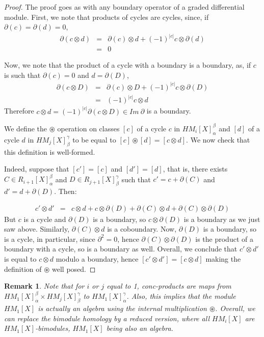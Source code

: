 \documentclass{article}
\newtheorem{remark}[definition]{Remark} %
\begin{document}
\begin{proof}
The proof goes as with any boundary operator of a graded differential module. First, we note that products of cycles are cycles, since, if $\partial(c)=\partial(d)=0$,  
$$
\begin{array}{rcl}
\partial(c\otimes d) & = & \partial(c)\otimes d +(-1)^{|c|} c\otimes \partial(d) \\
& = & 0
\end{array}
$$

Now, we note that the product of a cycle with a boundary is a boundary, as, if $c$ is such that $\partial(c)=0$ and $d=\partial(D)$, 
$$
\begin{array}{rcl}
\partial(c\otimes D) & = & \partial(c)\otimes D +(-1)^{|c|} c\otimes \partial(D) \\
& = & (-1)^{|c|} c \otimes d
\end{array}
$$
Therefore $c \otimes d=(-1)^{|c|} \partial(c\otimes D)\in Im \ \partial$ is a boundary. 

We define the $\circledast$ operation on classes $[c]$ of a cycle $c$ in $HM_i[X]^\beta_\alpha$ and $[d]$ of a cycle $d$ in $HM_j[X]^\gamma_\beta$ to be equal to $[c]\circledast [d]=[c\otimes d]$. We now check that this definition is well-formed. 

Indeed, suppose that $[c']=[c]$ and $[d']=[d]$, that is, there exists $C \in R_{i+1}[X]_\alpha^\beta$ and $D \in R_{j+1}[X]_\beta^\gamma$ such that $c'=c+\partial(C)$ and $d'=d+\partial(D)$. Then: 

$$
\begin{array}{rcl}
c'\otimes d' & = & c\otimes d+c\otimes \partial(D)+\partial(C)\otimes d + \partial(C)\otimes \partial(D)
\end{array}
$$
But $c$ is a cycle and $\partial(D)$ is a boundary, so $c\otimes \partial(D)$ is a boundary as we just saw above. Similarly, $\partial(C)\otimes d$ is a coboundary. Now, $\partial(D)$ is a boundary, so is a cycle, in particular, since $\partial^2=0$, hence $\partial(C)\otimes \partial(D)$ is the product of a boundary with a cycle, so is a boundary as well. Overall, we conclude that $c'\otimes d'$ is equal to $c\otimes d$ modulo a boundary, hence $[c'\otimes d']=[c\otimes d]$ making the definition of $\circledast$ well posed. 
\end{proof}

\begin{remark}
Note that for $i$ or $j$ equal to 1, conc-products are maps from $HM_1[X]_\alpha^\beta \times HM_j[X]_\beta^\gamma$ to $HM_1[X]_\alpha^\gamma$. Also, this implies that the module $HM_1[X]$ is actually an algebra using the internal multiplication $\circledast$. Overall, we can replace the bimodule homology by a reduced version, where all $HM_i[X]$ are $HM_1[X]$-bimodules, $HM_1[X]$ being also an algebra. 
\end{remark}
\end{document}
